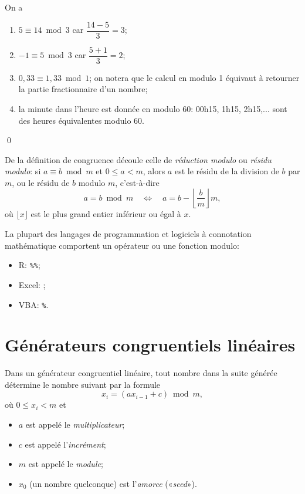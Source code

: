 \begin{exemple}
  On a
  \begin{enumerate}
  \item $5 \equiv 14 \bmod 3$ car $\dfrac{14 - 5}{3} = 3$;
  \item $-1 \equiv 5 \bmod 3$ car $\dfrac{5 + 1}{3} = 2$;
  \item $0,33 \equiv 1,33 \bmod 1$; on notera que le calcul en modulo 1
    équivaut à retourner la partie fractionnaire d'un nombre;
  \item la minute dans l'heure est donnée en modulo 60: 00h15, 1h15,
    2h15,... sont des heures équivalentes modulo 60.
  \end{enumerate}
  \qed
\end{exemple}

De la définition de congruence découle celle de \emph{réduction
  modulo} ou \emph{résidu modulo}: si $a \equiv b \bmod m$ et $0 \leq
a < m$, alors $a$ est le résidu de la division de $b$ par $m$, ou le
résidu de $b$ modulo $m$, c'est-à-dire
\begin{equation*}
  a = b \bmod m
  \quad\Leftrightarrow\quad
  a = b - \left\lfloor \frac{b}{m} \right\rfloor m,
\end{equation*}
où $\lfloor x \rfloor$ est le plus grand entier inférieur ou égal à
$x$.

La plupart des langages de programmation et logiciels à connotation
mathématique comportent un opérateur ou une fonction modulo:
\begin{itemize}
\item R: \verb|%%|;
\item Excel: ;
\item VBA: \verb|%|.
\end{itemize}


\section{Générateurs congruentiels linéaires}
\label{sec:generation:congruentiel}

Dans un générateur congruentiel linéaire, tout nombre dans la suite
générée détermine le nombre suivant par la formule
\begin{equation*}
  x_i = (a x_{i - 1} + c) \bmod m,
\end{equation*}
où $0 \leq x_i < m$ et
\begin{itemize}
\item $a$ est appelé le \emph{multiplicateur};
\item $c$ est appelé l'\emph{incrément};
\item $m$ est appelé le \emph{module};
\item $x_0$ (un nombre quelconque) est l'\emph{amorce} («\emph{seed}»).
\end{itemize}

